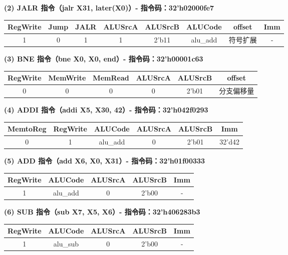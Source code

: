 \documentclass[12pt,a4paper]{article}
\begin{document}
\textbf{(2) JALR 指令（jalr X31, later(X0)）- 指令码：32'h02000fe7}

\begin{table}[H]
\centering
\begin{tabular}{|c|c|c|c|c|c|c|c|}
\hline
RegWrite & Jump & JALR & ALUSrcA & ALUSrcB & ALUCode & offset & Imm \\ \hline
1 & 0 & 1 & 1 & 2'b11 & alu\_add & 符号扩展 & - \\ \hline
\end{tabular}
\end{table}

\textbf{(3) BNE 指令（bne X0, X0, end）- 指令码：32'h00001c63}

\begin{table}[H]
\centering
\begin{tabular}{|c|c|c|c|c|c|}
\hline
RegWrite & MemWrite & MemRead & ALUSrcA & ALUSrcB & offset \\ \hline
0 & 0 & 0 & 0 & 2'b01 & 分支偏移量 \\ \hline
\end{tabular}
\end{table}

\textbf{(4) ADDI 指令（addi X5, X30, 42）- 指令码：32'h042f0293}

\begin{table}[H]
\centering
\begin{tabular}{|c|c|c|c|c|c|}
\hline
MemtoReg & RegWrite & ALUCode & ALUSrcA & ALUSrcB & Imm \\ \hline
0 & 1 & alu\_add & 0 & 2'b01 & 32'd42 \\ \hline
\end{tabular}
\end{table}

\textbf{(5) ADD 指令（add X6, X0, X31）- 指令码：32'h01f00333}

\begin{table}[H]
\centering
\begin{tabular}{|c|c|c|c|c|}
\hline
RegWrite & ALUCode & ALUSrcA & ALUSrcB & Imm \\ \hline
1 & alu\_add & 0 & 2'b00 & - \\ \hline
\end{tabular}
\end{table}

\textbf{(6) SUB 指令（sub X7, X5, X6）- 指令码：32'h406283b3}

\begin{table}[H]
\centering
\begin{tabular}{|c|c|c|c|c|}
\hline
RegWrite & ALUCode & ALUSrcA & ALUSrcB & Imm \\ \hline
1 & alu\_sub & 0 & 2'b00 & - \\ \hline
\end{tabular}
\end{table}
\end{document}
